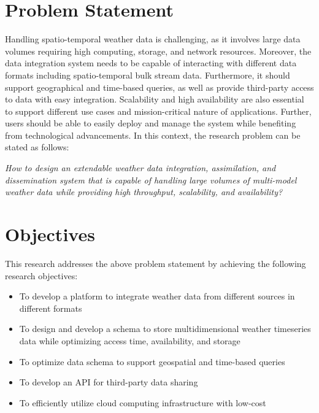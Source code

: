 \section{Problem Statement}
Handling spatio-temporal weather data is challenging, as it involves large data volumes requiring high computing, storage, and network resources. Moreover, the data integration system needs to be capable of interacting with different data formats including spatio-temporal bulk stream data. Furthermore, it should support geographical and time-based queries, as well as provide third-party access to data with easy integration. Scalability and high availability are also essential to support different use cases and mission-critical nature of applications.
Further, users should be able to easily deploy and manage the system while benefiting from technological advancements. 
In this context, the research problem can be stated as follows:

\emph{How to design an extendable weather data integration, assimilation, and dissemination system that is capable of handling large volumes of multi-model weather data while providing high throughput, scalability, and availability?}

\section{Objectives}
This research addresses the above problem statement by achieving the following research objectives:
\begin{itemize}
    \item To develop a platform to integrate weather data from different sources in different formats
    \item To design and develop a schema to store multidimensional weather timeseries data while optimizing access time, availability, and storage
    \item To optimize data schema to support geospatial and time-based queries
    \item To develop an API for third-party data sharing
    \item To efficiently utilize cloud computing infrastructure with low-cost
\end{itemize}
